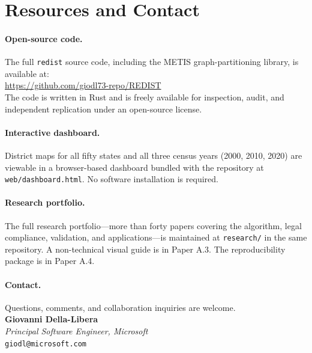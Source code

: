
\section{Resources and Contact}

\paragraph{Open-source code.}
The full \texttt{redist} source code, including the METIS graph-partitioning
library, is available at:\\
\url{https://github.com/giodl73-repo/REDIST}\\
The code is written in Rust and is freely available for inspection,
audit, and independent replication under an open-source license.

\paragraph{Interactive dashboard.}
District maps for all fifty states and all three census years (2000, 2010, 2020)
are viewable in a browser-based dashboard bundled with the repository
at \texttt{web/dashboard.html}.
No software installation is required.

\paragraph{Research portfolio.}
The full research portfolio---more than forty papers covering
the algorithm, legal compliance, validation, and applications---is
maintained at \texttt{research/} in the same repository.
A non-technical visual guide is in Paper A.3.
The reproducibility package is in Paper A.4.

\paragraph{Contact.}
Questions, comments, and collaboration inquiries are welcome.\\[4pt]
\noindent\textbf{Giovanni Della-Libera}\\
\textit{Principal Software Engineer, Microsoft}\\
\texttt{giodl@microsoft.com}
